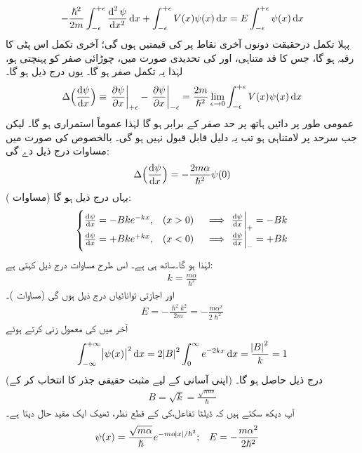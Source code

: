 \begin{align}
-\frac{\hslash^2}{2m}\int_{-\epsilon}^{+\epsilon}\frac{\dif^{\,2}\psi}{\dif x^2}\dif x+\int_{-\epsilon}^{+\epsilon}V(x)\psi(x)\dif x=E\int_{-\epsilon}^{+\epsilon}\psi(x)\dif x
\end{align}
پہلا تکمل درحقیقت دونوں آخری نقاط پر  کی قیمتیں ہوں گی؛ آخری تکمل اس پٹی کا رقبہ ہو گا، جس کا قد متناہی، اور  کی تحدیدی صورت میں، چوڑائی صفر کو پہنچتی ہو، لہٰذا یہ تکمل صفر ہو گا۔ یوں درج ذیل ہو گا۔
\begin{align}
\Delta\Big(\frac{\dif\psi}{\dif x}\Big)\equiv \left.\frac{\partial \psi}{\partial x}\right|_{+\epsilon}-\left.\frac{\partial \psi}{\partial x}\right|_{-\epsilon}=\frac{2m}{\hslash^2}\lim_{\epsilon\to0}\int_{-\epsilon}^{+\epsilon}V(x)\psi(x)\dif x
\end{align}
 عمومی طور پر دائیں ہاتھ پر حد صفر کے برابر ہو گا لہٰذا  عموماً استمراری ہو گا۔ لیکن جب سرحد پر  لامتناہی ہو تب یہ دلیل قابل قبول نہیں ہو گی۔ بالخصوص  کی صورت میں مساوات  درج ذیل دے گی: 
\begin{align}\label{مساوات_شروڈنگر_مبدا_پر_تفرقات_کا_فرق}
\Delta\Big(\frac{\dif \psi}{\dif x}\Big)=-\frac{2m\alpha}{\hslash^2}\psi(0)
\end{align}
یہاں درج ذیل ہو گا (مساوات ):
\begin{align*}
\begin{cases}
\frac{\dif \psi}{\dif x}=-Bke^{-kx},&(x>0)\quad \implies \left.\frac{\dif\psi}{\dif x}\right|_{+}=-Bk\\
\frac{\dif \psi}{\dif x}=+Bke^{+kx},&(x<0)\quad \implies \left.\frac{\dif\psi}{\dif x}\right|_{-}=+Bk
\end{cases}
\end{align*}
لہٰذا  ہو گا۔ساتھ ہی  ہے۔ اس طرح مساوات  درج ذیل کہتی ہے:
\begin{align}
k=\frac{m\alpha}{\hslash^2 }
\end{align}
اور اجازتی توانائیاں درج ذیل ہوں گی (مساوات )۔
\begin{align}
E=-\frac{\hslash^2 k^2}{2m}=-\frac{m\alpha^2}{2\hslash^2}
\end{align}
 آخر میں  کی معمول زنی کرتے ہوئے 
\begin{align*}
\int_{-\infty}^{+\infty}\abs{\psi(x)}^2\dif x=2\abs{B}^2\int_0^{\infty}e^{-2kx}\dif x=\frac{\abs{B}^2}{k}=1
\end{align*}
 (اپنی آسانی کے لیے مثبت حقیقی جذر کا انتخاب کر کے) درج ذیل حاصل ہو گا۔
\begin{align}
B=\sqrt{k}=\frac{\sqrt{m\alpha}}{\hslash}
\end{align}
آپ دیکھ سکتے ہیں کہ ڈیلٹا تفاعل،کی   کے قطع نظر، ٹھیک ایک مقید حال دیتا ہے۔ 
\begin{align}\label{مساوات_شروڈنگر_مقید_حال_ڈیلٹا}
\psi(x)&=\frac{\sqrt{m\alpha}}{\hslash}e^{-m\alpha\abs{x}/\hslash^2};&&E=-\frac{m\alpha^2}{2\hslash^2}
\end{align}

